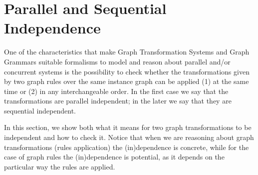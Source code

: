 \begin{example}

\end{example}

\section{Parallel and Sequential Independence}

One of the characteristics that make Graph Transformation Systems and Graph Grammars suitable formalisms to model and reason about parallel and/or concurrent systems is the possibility to check whether the transformations given by two graph rules over the same instance graph can be applied (1) at the same time or (2) in any interchangeable order. In the first case we say that the transformations are parallel independent; in the later we say that they are sequential independent.

In this section, we show both what it means for two graph transformations to be independent and how to check it. Notice that when we are reasoning about graph transformations (rules application) the (in)dependence is concrete, while for the case of graph rules the (in)dependence is potential, as it depends on the particular way the rules are applied.

